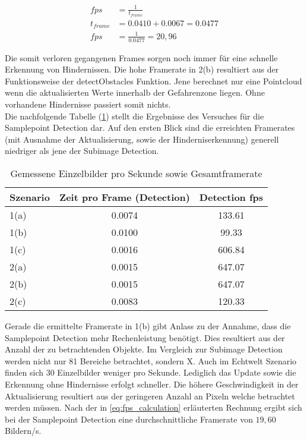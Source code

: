 \begin{equation}
\label{eq:fps_calculation}
\begin{aligned}
	fps &= \frac{1}{t_{frame}}\\
	t_{frame} &= 0.0410 + 0.0067 = 0.0477\\
	fps &= \frac{1}{0.0477} = 20,96
\end{aligned}
\end{equation}

\noindent
Die somit verloren gegangenen Frames sorgen noch immer für eine schnelle Erkennung von Hindernissen. Die hohe Framerate in 2(b) resultiert aus der Funktionsweise der detectObstacles Funktion. Jene berechnet nur eine Pointcloud wenn die aktualisierten Werte innerhalb der Gefahrenzone liegen. Ohne vorhandene Hindernisse passiert somit nichts.\\

\noindent
Die nachfolgende Tabelle (\ref{tbl:samplepoint_framerate}) stellt die Ergebnisse des Versuches für die Samplepoint Detection dar. Auf den ersten Blick sind die erreichten Framerates (mit Ausnahme der Aktualisierung, sowie der Hinderniserkennung) generell niedriger als jene der Subimage Detection. 

\begin{table}[h]
\centering
\begin{tabular}{|l|c|c|}
\hline
Szenario & Zeit pro Frame (Detection) & Detection fps \\ \hline\hline
1(a)     & 0.0074           			  & 133.61         \\ \hline
1(b)     & 0.0100           			  & 99.33          \\ \hline
1(c)     & 0.0016           			  & 606.84         \\ \hline\hline
2(a)     & 0.0015           			  & 647.07         \\ \hline
2(b)     & 0.0015           		  	  & 647.07         \\ \hline
2(c)     & 0.0083           	 		  & 120.33         \\ \hline
\end{tabular}
\caption{Gemessene Einzelbilder pro Sekunde sowie Gesamtframerate}
\label{tbl:samplepoint_framerate}
\end{table}

\noindent
Gerade die ermittelte Framerate in 1(b) gibt Anlass zu der Annahme, dass die Samplepoint Detection mehr Rechenleistung benötigt. Dies resultiert aus der Anzahl der zu betrachtenden Objekte. Im Vergleich zur Subimage Detection werden nicht nur 81 Bereiche betrachtet, sondern X. Auch im Echtwelt Szenario finden sich 30 Einzelbilder weniger pro Sekunde. Lediglich das Update sowie die Erkennung ohne Hindernisse erfolgt schneller. Die höhere Geschwindigkeit in der Aktualisierung resultiert aus der geringeren Anzahl an Pixeln welche betrachtet werden müssen. Nach der in \ref{eq:fps_calculation} erläuterten Rechnung ergibt sich bei der Samplepoint Detection eine durchschnittliche Framerate von $19,60$ Bildern/s.

